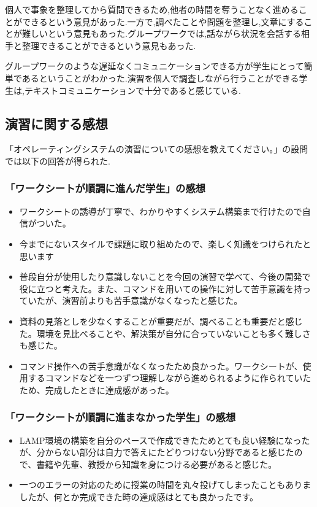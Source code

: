 \documentclass[11pt, a4paper]{jreport}
\begin{document}
個人で事象を整理してから質問できるため,他者の時間を奪うことなく進めることができるという意見があった.一方で,調べたことや問題を整理し,文章にすることが難しいという意見もあった.グループワークでは,話ながら状況を会話する相手と整理できることができるという意見もあった.

グループワークのような遅延なくコミュニケーションできる方が学生にとって簡単であるということがわかった.演習を個人で調査しながら行うことができる学生は,テキストコミュニケーションで十分であると感じている.

\subsection{演習に関する感想}

「オペレーティングシステムの演習についての感想を教えてください。」の設問では以下の回答が得られた.

\subsubsection{「ワークシートが順調に進んだ学生」の感想}

\begin{itemize}
\item ワークシートの誘導が丁寧で、わかりやすくシステム構築まで行けたので自信がついた。
\item 今までにないスタイルで課題に取り組めたので、楽しく知識をつけられたと思います
\item 普段自分が使用したり意識しないことを今回の演習で学べて、今後の開発で役に立つと考えた。また、コマンドを用いての操作に対して苦手意識を持っていたが、演習前よりも苦手意識がなくなったと感じた。
\item 資料の見落としを少なくすることが重要だが、調べることも重要だと感じた。環境を見比べることや、解決策が自分に合っていないことも多く難しさも感じた。
\item コマンド操作への苦手意識がなくなったため良かった。ワークシートが、使用するコマンドなどを一つずつ理解しながら進められるように作られていたため、完成したときに達成感があった。
\end{itemize}

\subsubsection{「ワークシートが順調に進まなかった学生」の感想}

\begin{itemize}
\item LAMP環境の構築を自分のペースで作成できたためとても良い経験になったが、分からない部分は自力で答えにたどりつけない分野であると感じたので、書籍や先輩、教授から知識を身につける必要があると感じた。
\item 一つのエラーの対応のために授業の時間を丸々投げてしまったこともありましたが、何とか完成できた時の達成感はとても良かったです。
\end{itemize}
\end{document}
